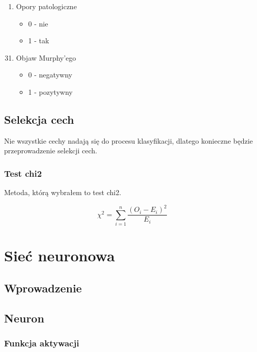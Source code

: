 \documentclass{report}
\begin{document}
\begin{itemize}
\begin{enumerate}
            \item Opory patologiczne
            \begin{itemize}
                \item 0 - nie
                \item 1 - tak
            \end{itemize}
        \end{enumerate}
        \begin{enumerate}
            \setcounter{enumi}{30}
            \item Objaw Murphy'ego
            \begin{itemize}
                \item 0 - negatywny
                \item 1 - pozytywny
            \end{itemize}
        \end{enumerate}
    \end{itemize}

    \section{Selekcja cech}

    Nie wszystkie cechy nadają się do procesu klasyfikacji, dlatego konieczne będzie przeprowadzenie selekcji cech.

    \subsection{Test chi2}

    Metoda, którą wybrałem to test chi2.

    $$
    \chi ^ 2 = \sum_{i=1}^{n}{ \frac{{(O_i - E_i) ^ 2}}{E_i}}
    $$

    \chapter{Sieć neuronowa}

    \section{Wprowadzenie}

    \section{Neuron}

    \subsection{Funkcja aktywacji}
\end{document}
